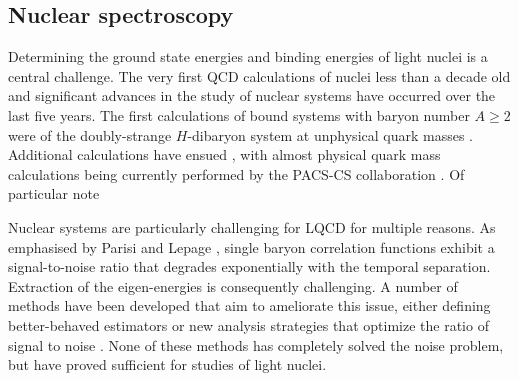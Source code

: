 
 

\subsection{Nuclear spectroscopy}

Determining the ground state energies and binding energies of light nuclei is a central challenge. The very first QCD calculations of nuclei less than a decade old and significant advances in the study of nuclear systems have occurred over the last five years.
The first calculations of bound systems with baryon number $A\ge2$ were of the doubly-strange $H$-dibaryon system at unphysical quark masses
\cite{Beane:2010hg,Inoue:2010es,Beane:2011xf}. Additional calculations have ensued \cite{Beane:2012vq,Yamazaki:2012hi,Yamazaki:2015asa}, with almost physical quark mass calculations being currently performed by the PACS-CS collaboration \cite{}. Of particular note

Nuclear systems are particularly challenging for LQCD for multiple reasons. As emphasised by Parisi and Lepage \cite{Lepage:1989hd,Parisi}, single baryon correlation functions exhibit a signal-to-noise ratio that degrades exponentially with the temporal separation. Extraction of the eigen-energies is consequently challenging. A number of methods have been developed that aim to ameliorate this issue, either defining better-behaved estimators \cite{Beane:2014oea,Wagman:2017gqi,Wagman:2017xfh,Wagman:2016bam} or new analysis strategies that optimize the ratio of signal to noise \cite{Detmold:2014hla}. None of these methods has completely solved the noise problem, but have proved sufficient for studies of light nuclei.





